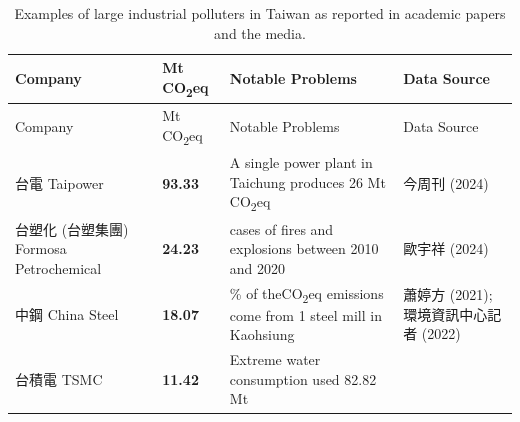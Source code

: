 \documentclass[
  12pt,
  letterpaper,
  DIV=11,
  numbers=noendperiod]{scrartcl}
\begin{document}
\begin{longtable}[]{@{}
  >{\raggedright\arraybackslash}p{}
  >{\raggedleft\arraybackslash}p{}
  >{\raggedright\arraybackslash}p{}
  >{\raggedright\arraybackslash}p{}@{}}
\caption[Large Industrial Polluters in Taiwan]{Examples of large
industrial polluters in Taiwan as reported in academic papers and the
media.}\tabularnewline
\toprule\noalign{}
\begin{minipage}[b]{\linewidth}\raggedright
Company
\end{minipage} & \begin{minipage}[b]{\linewidth}\raggedleft
2023 Mt CO\textsubscript{2}eq
\end{minipage} & \begin{minipage}[b]{\linewidth}\raggedright
Notable Problems
\end{minipage} & \begin{minipage}[b]{\linewidth}\raggedright
Data Source
\end{minipage} \\
\midrule\noalign{}
\endfirsthead
\toprule\noalign{}
\begin{minipage}[b]{\linewidth}\raggedright
Company
\end{minipage} & \begin{minipage}[b]{\linewidth}\raggedleft
2023 Mt CO\textsubscript{2}eq
\end{minipage} & \begin{minipage}[b]{\linewidth}\raggedright
Notable Problems
\end{minipage} & \begin{minipage}[b]{\linewidth}\raggedright
Data Source
\end{minipage} \\
\midrule\noalign{}
\endhead
\bottomrule\noalign{}
\endlastfoot
台電 Taipower & \textbf{93.33} & A single power plant in Taichung
produces 26 Mt CO\textsubscript{2}eq & 今周刊 (2024) \\
台塑化 (台塑集團) Formosa Petrochemical & \textbf{24.23} & 16 cases of
fires and explosions between 2010 and 2020 & 歐宇祥 (2024) \\
中鋼 China Steel & \textbf{18.07} & 60\% of theCO\textsubscript{2}eq
emissions come from 1 steel mill in Kaohsiung & 蕭婷方 (2021);
環境資訊中心記者 (2022) \\
台積電 TSMC & \textbf{11.42} & Extreme water consumption used 82.82 Mt

\end{longtable}
\end{document}
